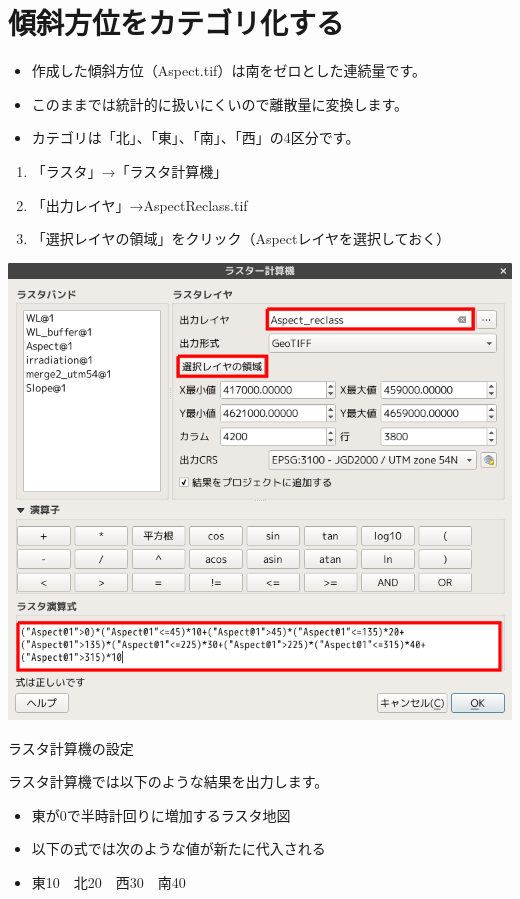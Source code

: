 \documentclass[14Q,twocolumn]{jsarticle}
\makeatletter
\newenvironment{figurehere}
  {\def\@captype{figure}}
  {}
\makeatother
\begin{document}
\section{傾斜方位をカテゴリ化する}

\begin{itemize}
\item 作成した傾斜方位（Aspect.tif）は南をゼロとした連続量です。
\item このままでは統計的に扱いにくいので離散量に変換します。
\item カテゴリは「北」、「東」、「南」、「西」の4区分です。
\end{itemize}

\begin{enumerate}
\item 「ラスタ」→「ラスタ計算機」
\item 「出力レイヤ」→AspectReclass.tif
\item 「選択レイヤの領域」をクリック（Aspectレイヤを選択しておく）
\end{enumerate}

\begin{figurehere}
\centering
\includegraphics[width=1\linewidth]{37.png}
\caption{ラスタ計算機の設定}
\end{figurehere}

ラスタ計算機では以下のような結果を出力します。

\begin{itemize}
\item 東が0で半時計回りに増加するラスタ地図
\item 以下の式では次のような値が新たに代入される
\item 東10　北20　西30　南40
\end{itemize}
\end{document}
